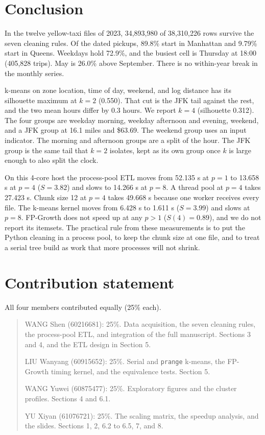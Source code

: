 \documentclass[11pt,a4paper]{article}
\begin{document}
\section{Conclusion}
\label{sec:conclusion}

In the twelve yellow-taxi files of 2023, 34,893,980 of 38,310,226 rows survive the seven cleaning rules. Of the dated pickups, 89.8\% start in Manhattan and 9.79\% start in Queens. Weekdays hold 72.9\%, and the busiest cell is Thursday at 18:00 (405,828 trips). May is 26.0\% above September. There is no within-year break in the monthly series.

k-means on zone location, time of day, weekend, and log distance has its silhouette maximum at $k = 2$ (0.550). That cut is the JFK tail against the rest, and the two mean hours differ by 0.3 hours. We report $k = 4$ (silhouette 0.312). The four groups are weekday morning, weekday afternoon and evening, weekend, and a JFK group at 16.1 miles and \$63.69. The weekend group uses an input indicator. The morning and afternoon groups are a split of the hour. The JFK group is the same tail that $k = 2$ isolates, kept as its own group once $k$ is large enough to also split the clock.

On this 4-core host the process-pool ETL moves from 52.135 s at $p = 1$ to 13.658 s at $p = 4$ ($S = 3.82$) and slows to 14.266 s at $p = 8$. A thread pool at $p = 4$ takes 27.423 s. Chunk size 12 at $p = 4$ takes 49.668 s because one worker receives every file. The k-means kernel moves from 6.428 s to 1.611 s ($S = 3.99$) and slows at $p = 8$. FP-Growth does not speed up at any $p > 1$ ($S(4) = 0.89$), and we do not report its itemsets. The practical rule from these measurements is to put the Python cleaning in a process pool, to keep the chunk size at one file, and to treat a serial tree build as work that more processes will not shrink.

\section*{Contribution statement}
\label{sec:contrib}
All four members contributed equally (25\% each).

\begin{quote}
WANG Shen (60216681): 25\%. Data acquisition, the seven cleaning rules, the process-pool ETL, and integration of the full manuscript. Sections 3 and 4, and the ETL design in Section 5.

LIU Wanyang (60915652): 25\%. Serial and \texttt{prange} k-means, the FP-Growth timing kernel, and the equivalence tests. Section 5.

WANG Yuwei (60875477): 25\%. Exploratory figures and the cluster profiles. Sections 4 and 6.1.

YU Xiyan (61076721): 25\%. The scaling matrix, the speedup analysis, and the slides. Sections 1, 2, 6.2 to 6.5, 7, and 8.
\end{quote}

\begingroup
\raggedright

\endgroup
\end{document}
